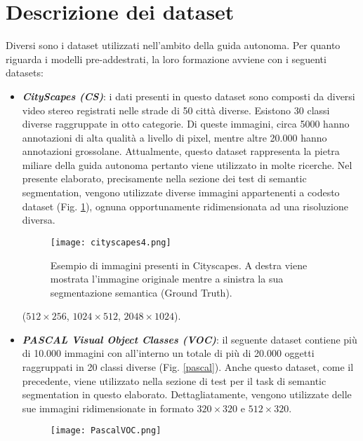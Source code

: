 \section{Descrizione dei dataset}\label{datasets_description}
Diversi sono i dataset utilizzati nell'ambito della guida autonoma. Per 
quanto riguarda i modelli pre-addestrati, la loro formazione avviene con i 
seguenti datasets:
\begin{itemize}
    \item {\bfseries{\emph{CityScapes (CS)}}}\cite{Cityscapes}: i dati presenti in questo dataset sono composti 
    da diversi video stereo registrati nelle strade di 50 città diverse. 
    Esistono 30 classi diverse raggruppate in otto categorie. Di queste 
    immagini, circa 5000 hanno annotazioni di alta qualità a livello di 
    pixel, mentre altre 20.000 hanno annotazioni grossolane. Attualmente, 
    questo dataset rappresenta la pietra miliare della guida autonoma 
    pertanto viene utilizzato in molte ricerche. Nel presente elaborato, 
    precisamente nella sezione dei test di semantic segmentation, vengono 
    utilizzate diverse immagini appartenenti a codesto dataset (Fig. \ref{cityscapes}), 
    ognuna opportunamente ridimensionata ad una risoluzione diversa.
    \begin{figure}
        \centering
        \texttt{[image: cityscapes4.png]}
        \centering
        \caption{Esempio di immagini presenti in Cityscapes. A destra viene mostrata l'immagine originale mentre a sinistra la sua segmentazione semantica (Ground Truth).}
        \label{cityscapes}
    \end{figure} 
    ($512\times 256$, $1024\times 512$, $2048\times 1024$).
    \item {\bfseries{\emph{PASCAL Visual Object Classes (VOC)}}}\cite{VOC}: il seguente dataset 
    contiene più di 10.000 immagini con all'interno un totale di più di 
    20.000 oggetti raggruppati in 20 classi diverse (Fig. \ref{pascal}). Anche questo 
    dataset, come il precedente, viene utilizzato nella sezione di test per il 
    task di semantic segmentation in questo elaborato. Dettagliatamente, 
    vengono utilizzate delle sue immagini ridimensionate in formato $320\times 320$ e $512\times 320$.
    \begin{figure}
        \centering
        \texttt{[image: PascalVOC.png]}
        \centering

\end{figure}
\end{itemize}

